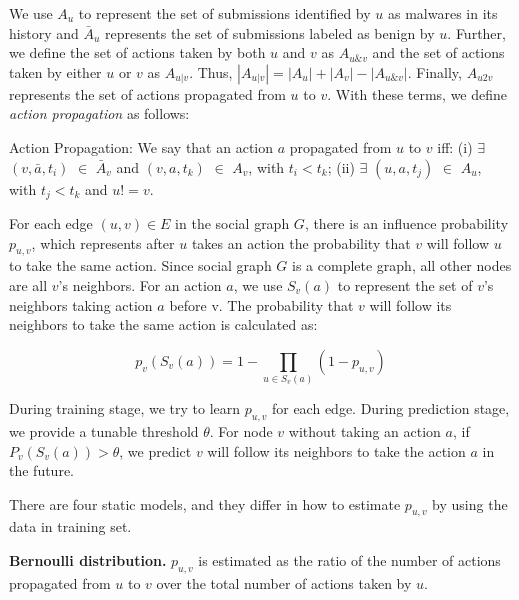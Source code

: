 We use $A_u$ to represent the set of submissions identified by $u$ as malwares in its history
and $\bar{A}_u$ represents the set of submissions labeled as benign by $u$.
Further, we define the set of actions taken by both $u$ and $v$ as $A_{u\&v}$ 
and the set of actions taken by either $u$ or $v$ as $A_{u|v}$.
Thus, $|A_{u|v}| =   |A_u| + |A_v| - |A_{u\&v}|$.
Finally, $A_{u2v}$ represents the set of actions propagated from $u$ to $v$. 
With these terms, we define {\em action propagation} as follows: 

\begin{definition}{Action Propagation:}
We say that an action $a$ propagated from $u$ to $v$ iff: (i) $\exists$ $(v, \bar{a}, t_i)$ $\in$ $\bar{A}_v$ 
and $(v, a, t_k)$ $\in$ $A_v$, with $t_i < t_k$; (ii) $\exists$ $(u, a, t_j)$ $\in$ $A_u$, with $t_j < t_k$ and $u != v$. 
\end{definition}

For each edge $(u, v) \in E$ in the social graph $G$, 
there is an influence probability $p_{u,v}$,
which represents after $u$ takes an action the probability that $v$ will follow $u$ to take the same action. 
Since social graph $G$ is a complete graph, 
all other nodes are all $v$'s neighbors. 
For an action $a$, we use $S_v(a)$ to represent the set of $v$'s neighbors taking action $a$ before v. 
The probability that $v$ will follow its neighbors to take the same action is calculated as:

\begin{equation} \label{eq:setp}
p_v(S_v(a)) = 1 - \prod\limits_{u \in S_v(a)}(1 - p_{u,v})
\end{equation}

During training stage, we try to learn $p_{u,v}$ for each edge. 
During prediction stage, we provide a tunable threshold $\theta$. 
For node $v$ without taking an action $a$, 
if $P_v(S_v(a))>\theta$, 
we predict $v$ will follow its neighbors to take the action $a$ in the future. 

There are four static models, and they differ in how to estimate $p_{u,v}$ by using the data in training set. 


{\bf Bernoulli distribution.} $p_{u,v}$ is estimated as the ratio of the number of actions 
propagated from $u$ to $v$ over the total number of actions taken by $u$.

